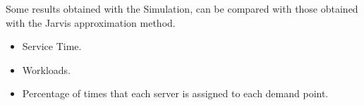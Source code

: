 Some results obtained with the Simulation,
can be compared
with those obtained with
the Jarvis approximation method. 
\begin{itemize}
\item Service Time.
\item Workloads.
\item Percentage of times
  that each server
  is assigned to each demand point.
\end{itemize}
